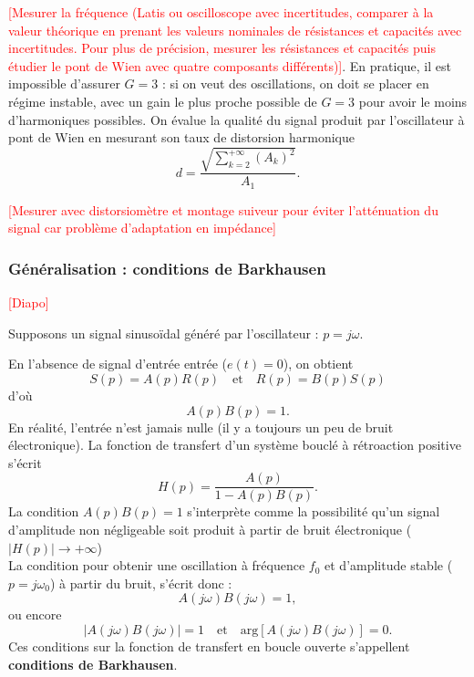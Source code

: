 \documentclass[11pt,a4paper]{report}
\begin{document}
\textcolor{red}{[Mesurer la fréquence (Latis ou oscilloscope avec incertitudes, comparer à la valeur théorique en prenant les valeurs nominales de résistances et capacités avec incertitudes. Pour plus de précision, mesurer les résistances et capacités puis étudier le pont de Wien avec quatre composants différents)]}.
En pratique, il est impossible d'assurer $G = 3$ : si on veut des oscillations, on doit se placer en régime instable, avec un gain le plus proche possible de $G = 3$ pour avoir le moins d'harmoniques possibles. On évalue la qualité du signal produit par l'oscillateur à pont de Wien en mesurant son taux de distorsion harmonique
\begin{equation}
	d = \frac{\sqrt{\sum_{k=2}^{+\infty}(A_k)^2}}{A_1}.
\end{equation}

\textcolor{red}{[Mesurer avec distorsiomètre et montage suiveur pour éviter l'atténuation du signal car problème d'adaptation en impédance]}

\subsubsection{Généralisation : conditions de Barkhausen}

\textcolor{red}{[Diapo]}

Supposons un signal sinusoïdal généré par l'oscillateur : $p = j \omega$.

En l'absence de signal d'entrée entrée ($e(t) = 0$), on obtient 
\begin{equation}
	S(p) = A(p)R(p) \quad\text{et}\quad R(p) = B(p)S(p) 
\end{equation}
d'où
\begin{equation}
	\boxed{A(p)B(p) = 1}.
\end{equation}
En réalité, l'entrée n'est jamais nulle (il y a toujours un peu de bruit électronique). La fonction de transfert d'un système bouclé à rétroaction positive s'écrit
\begin{equation}
	H(p) = \frac{A(p)}{1 - A(p)B(p)}.
\end{equation}
La condition $A(p)B(p) = 1$ s'interprète comme la possibilité qu'un signal d'amplitude non négligeable soit produit à partir de bruit électronique ($|H(p)| \rightarrow +\infty$)\\

La condition pour obtenir une oscillation à fréquence $f_0$ et d'amplitude stable ($p = j\omega_0$) à partir du bruit, s'écrit donc :
\begin{equation}
	A(j\omega)B(j\omega) = 1,
\end{equation}
ou encore
\begin{equation}
	\boxed{|A(j\omega)B(j\omega)| = 1 \quad\text{et}\quad \text{arg}\left[A(j\omega)B(j\omega)\right] = 0.}
\end{equation}
Ces conditions sur la fonction de transfert en boucle ouverte s'appellent \textbf{conditions de Barkhausen}.\\
\end{document}
